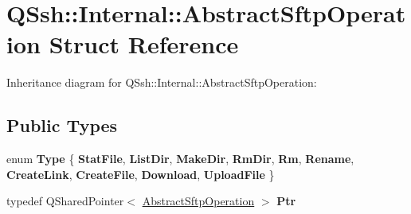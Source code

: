 \hypertarget{struct_q_ssh_1_1_internal_1_1_abstract_sftp_operation}{}\section{Q\+Ssh\+:\+:Internal\+:\+:Abstract\+Sftp\+Operation Struct Reference}
\label{struct_q_ssh_1_1_internal_1_1_abstract_sftp_operation}


Inheritance diagram for Q\+Ssh\+:\+:Internal\+:\+:Abstract\+Sftp\+Operation\+:
\subsection*{Public Types}
\begin{DoxyCompactItemize}
\item 
\mbox{\label{struct_q_ssh_1_1_internal_1_1_abstract_sftp_operation_aa13af3ceeb1a327fed85a551bc4edeab}} 
enum {\bfseries Type} \{ \newline
{\bfseries Stat\+File}, 
{\bfseries List\+Dir}, 
{\bfseries Make\+Dir}, 
{\bfseries Rm\+Dir}, 
\newline
{\bfseries Rm}, 
{\bfseries Rename}, 
{\bfseries Create\+Link}, 
{\bfseries Create\+File}, 
\newline
{\bfseries Download}, 
{\bfseries Upload\+File}
 \}
\item 
\mbox{\label{struct_q_ssh_1_1_internal_1_1_abstract_sftp_operation_a1feafc5004b12d895093253bcd36ad40}} 
typedef Q\+Shared\+Pointer$<$ \mbox{\hyperlink{struct_q_ssh_1_1_internal_1_1_abstract_sftp_operation}{Abstract\+Sftp\+Operation}} $>$ {\bfseries Ptr}
\end{DoxyCompactItemize}
